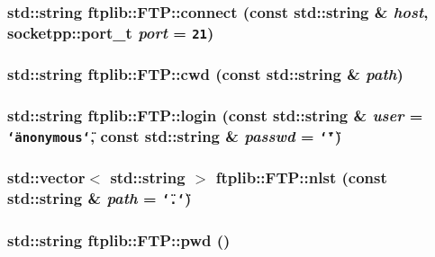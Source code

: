 \hypertarget{classftplib_1_1FTP_fbd3444a33e5dd055474c9a0d6aabba5}{
\subsubsection[{connect}]{\setlength{\rightskip}{0pt plus 5cm}std::string ftplib::FTP::connect (const std::string \& {\em host}, \/  {\bf socketpp::port\_\-t} {\em port} = {\tt 21})}}
\label{classftplib_1_1FTP_fbd3444a33e5dd055474c9a0d6aabba5}


\hypertarget{classftplib_1_1FTP_7cd3c7fc71ae0c7dbdfcee88417d2685}{
\subsubsection[{cwd}]{\setlength{\rightskip}{0pt plus 5cm}std::string ftplib::FTP::cwd (const std::string \& {\em path})}}
\label{classftplib_1_1FTP_7cd3c7fc71ae0c7dbdfcee88417d2685}


\hypertarget{classftplib_1_1FTP_dc39751d00808d35183fb19c483b3589}{
\subsubsection[{login}]{\setlength{\rightskip}{0pt plus 5cm}std::string ftplib::FTP::login (const std::string \& {\em user} = {\tt \char`\"{}anonymous\char`\"{}}, \/  const std::string \& {\em passwd} = {\tt \char`\"{}\char`\"{}})}}
\label{classftplib_1_1FTP_dc39751d00808d35183fb19c483b3589}


\hypertarget{classftplib_1_1FTP_a793fa113ee6fc82e3db3b7ed769ff3f}{
\subsubsection[{nlst}]{\setlength{\rightskip}{0pt plus 5cm}std::vector$<$ std::string $>$ ftplib::FTP::nlst (const std::string \& {\em path} = {\tt \char`\"{}.\char`\"{}})}}
\label{classftplib_1_1FTP_a793fa113ee6fc82e3db3b7ed769ff3f}


\hypertarget{classftplib_1_1FTP_7c01c7b062848c7fc1d3caf95758b109}{
\subsubsection[{pwd}]{\setlength{\rightskip}{0pt plus 5cm}std::string ftplib::FTP::pwd ()}}
\label{classftplib_1_1FTP_7c01c7b062848c7fc1d3caf95758b109}


